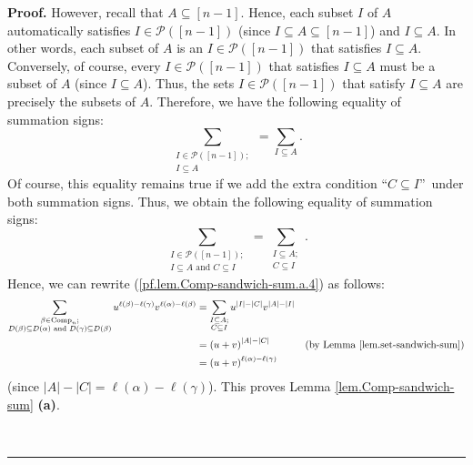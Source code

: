 \documentclass[numbers=enddot,12pt,final,onecolumn,notitlepage]{scrartcl}%
\theoremstyle{definition}
\newenvironment{proof}[1][Proof]{\noindent\textbf{#1.} }{\ \rule{0.5em}{0.5em}}
\let\sumnonlimits\sum
\renewcommand{\sum}{\sumnonlimits\limits}
\newenvironment{verlong}{}{}
\begin{document}
\begin{verlong}
\begin{proof}
However, recall that $A\subseteq\left[  n-1\right]  $. Hence, each subset $I$
of $A$ automatically satisfies $I\in\mathcal{P}\left(  \left[  n-1\right]
\right)  $ (since $I\subseteq A\subseteq\left[  n-1\right]  $) and $I\subseteq
A$. In other words, each subset of $A$ is an $I\in\mathcal{P}\left(  \left[
n-1\right]  \right)  $ that satisfies $I\subseteq A$. Conversely, of course,
every $I\in\mathcal{P}\left(  \left[  n-1\right]  \right)  $ that satisfies
$I\subseteq A$ must be a subset of $A$ (since $I\subseteq A$). Thus, the sets
$I\in\mathcal{P}\left(  \left[  n-1\right]  \right)  $ that satisfy
$I\subseteq A$ are precisely the subsets of $A$. Therefore, we have the
following equality of summation signs:%
\[
\sum_{\substack{I\in\mathcal{P}\left(  \left[  n-1\right]  \right)
;\\I\subseteq A}}=\sum_{I\subseteq A}.
\]
Of course, this equality remains true if we add the extra condition
\textquotedblleft$C\subseteq I$\textquotedblright\ under both summation signs.
Thus, we obtain the following equality of summation signs:%
\[
\sum_{\substack{I\in\mathcal{P}\left(  \left[  n-1\right]  \right)
;\\I\subseteq A\text{ and }C\subseteq I}}=\sum_{\substack{I\subseteq
A;\\C\subseteq I}}.
\]
Hence, we can rewrite (\ref{pf.lem.Comp-sandwich-sum.a.4}) as follows:%
\begin{align*}
\sum_{\substack{\beta\in\operatorname*{Comp}\nolimits_{n};\\D\left(
\beta\right)  \subseteq D\left(  \alpha\right)  \text{ and }D\left(
\gamma\right)  \subseteq D\left(  \beta\right)  }}u^{\ell\left(  \beta\right)
-\ell\left(  \gamma\right)  }v^{\ell\left(  \alpha\right)  -\ell\left(
\beta\right)  }  &  =\sum_{\substack{I\subseteq A;\\C\subseteq I}%
}u^{\left\vert I\right\vert -\left\vert C\right\vert }v^{\left\vert
A\right\vert -\left\vert I\right\vert }\\
&  =\left(  u+v\right)  ^{\left\vert A\right\vert -\left\vert C\right\vert
}\ \ \ \ \ \ \ \ \ \ \left(  \text{by Lemma \ref{lem.set-sandwich-sum}}\right)
\\
&  =\left(  u+v\right)  ^{\ell\left(  \alpha\right)  -\ell\left(
\gamma\right)  }%
\end{align*}
(since $\left\vert A\right\vert -\left\vert C\right\vert =\ell\left(
\alpha\right)  -\ell\left(  \gamma\right)  $). This proves Lemma
\ref{lem.Comp-sandwich-sum} \textbf{(a)}.


\end{proof}
\end{verlong}
\end{document}
